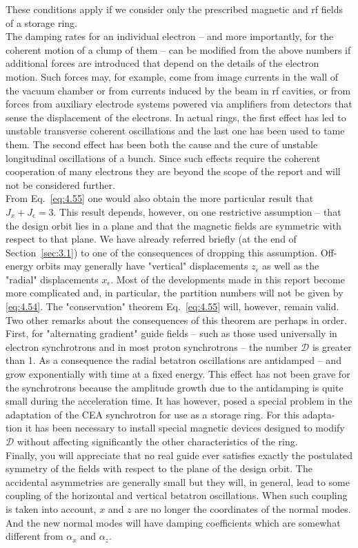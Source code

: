  These conditions apply if we consider only the prescribed magnetic and rf fields of a storage ring.\\
The damping rates for an individual electron -- and more importantly, for the coherent motion of a clump of them -- can be modified from the above numbers if additional forces are introduced
 that depend on the details of the electron motion. Such forces may, for example, come from image currents in the wall of the vacuum chamber or from currents induced by the beam in rf cavities, or from forces from auxiliary electrode systems powered via amplifiers from detectors that sense the displacement of the electrons. In actual rings, the first effect has led to unstable transverse coherent oscillations and the last one has been used to tame them. The
second effect has been both the cause and the cure of unstable longitudinal oscillations of a bunch. Since such effects require the coherent cooperation of many electrons they are beyond the scope of the report and will not be considered further.\\
From Eq.~\eqref{eq:4.55} one would also obtain the more particular result that $J_x+ J_\epsilon = 3$. This result depends, however, on one restrictive assumption -- that the design orbit lies in a plane and that the magnetic fields are symmetric with respect to that plane. We have already referred briefly (at the end of Section~\ref{sec:3.1}) to one of the consequences of dropping this assumption. Off-energy orbits may generally have "vertical" displacements $z_\epsilon$ as well as the "radial" displacements $x_\epsilon$. Most of the developments
 made in this report become more complicated and, in particular, the partition numbers will not be given by \eqref{eq:4.54}. The "conservation" theorem Eq.~\eqref{eq:4.55} will, however,
 remain valid.\\
Two other remarks about the consequences of this theorem are perhaps in order. First, for "alternating gradient" guide fields -- such as those used universally in electron synchrotrons
 and in most proton synchrotrons -- the number $\mathscr{D}$ is greater than 1. As a consequence the radial betatron oscillations are antidamped -- and grow exponentially with time at a fixed energy. This effect has not been grave for the synchrotrons because the amplitude growth due to the antidamping is quite small during the acceleration time. It has however, posed a special problem in the adaptation of the CEA synchrotron for use as a storage ring. For this adapta-
tion it has been necessary to install special magnetic devices designed to modify $\mathscr{D}$
 without affecting significantly the other characteristics of the ring.\\
 Finally, you will appreciate that no real guide ever satisfies exactly the postulated symmetry
 of the fields with respect to the plane of the design orbit. The accidental asymmetries
 are generally small but they will, in general, lead to some coupling of the horizontal and vertical betatron oscillations. When such coupling is taken into account, $x$ and $z$ are no longer the coordinates of the normal modes. And the new normal modes will have damping coefficients which are somewhat different from $\alpha_x$ and $\alpha_z$.




